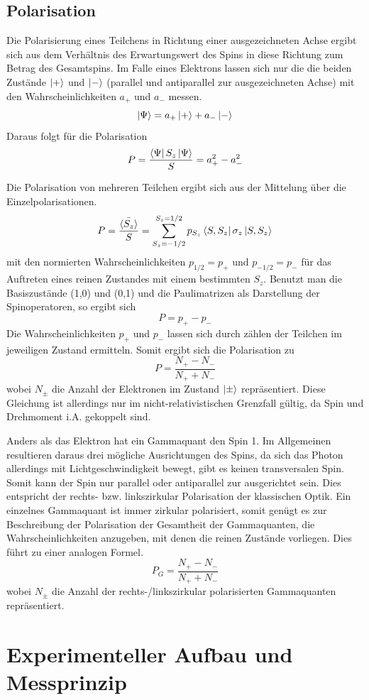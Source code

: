 \subsection{Polarisation}
Die Polarisierung eines Teilchens in Richtung einer ausgezeichneten Achse ergibt sich aus dem Verhältnis des Erwartungswert des Spins in diese Richtung zum Betrag des Gesamtspins. Im Falle eines Elektrons lassen sich nur die die beiden Zustände $\ket{+}$ und $\ket{-}$ (parallel und antiparallel zur ausgezeichneten Achse) mit den Wahrscheinlichkeiten $a_+$ und $a_-$ messen. 
$$\ket{\Psi} = a_+\ket{+} + a_-\ket{-}$$
Daraus folgt für die Polarisation
$$P = \frac{\bra{\Psi} S_z  \ket{\Psi}}{S} = a_+^2 - a_-^2$$

Die Polarisation von mehreren Teilchen ergibt sich aus der Mittelung über die Einzelpolarisationen. 
$$P = \Bar{\frac{{\braket{S_z}}}{S}} = \sum_{S_z = -1/2}^{S_z=1/2} p_{S_z} \bra{S,S_z}\sigma_z\ket{S,S_z}$$
mit den normierten Wahrscheinlichkeiten $p_{1/2} = p_+$ und $p_{-1/2}= p_-$ für das Auftreten eines reinen Zustandes mit einem bestimmten $S_z$. Benutzt man die Basiszustände (1,0) und (0,1) und die Paulimatrizen als Darstellung der Spinoperatoren, so ergibt sich 
$$P = p_+ - p_-$$
Die Wahrscheinlichkeiten $p_+$ und $p_-$ lassen sich durch zählen der Teilchen im jeweiligen Zustand ermitteln. Somit ergibt sich die Polarisation zu
$$P = \frac{N_+ - N_-}{N_+ + N_-}$$
wobei $N_\pm$ die Anzahl der Elektronen im Zustand $\ket{\pm}$ repräsentiert. Diese Gleichung ist allerdings nur im nicht-relativistischen Grenzfall gültig, da Spin und Drehmoment i.A. gekoppelt sind. 

Anders als das Elektron hat ein Gammaquant den Spin 1. Im Allgemeinen resultieren daraus drei mögliche Ausrichtungen des Spins, da sich das Photon allerdings mit Lichtgeschwindigkeit bewegt, gibt es keinen transversalen Spin. Somit kann der Spin nur parallel oder antiparallel zur ausgerichtet sein. Dies entspricht der rechts- bzw. linkszirkular Polarisation der klassischen Optik. Ein einzelnes Gammaquant ist immer zirkular polarisiert, somit genügt es zur Beschreibung der Polarisation der Gesamtheit der Gammaquanten, die Wahrscheinlichkeiten anzugeben, mit denen die reinen Zustände vorliegen. Dies führt zu einer analogen Formel.
$$P_G = \frac{N_+ - N_-}{N_+ + N_-}$$
wobei $N_\pm$ die Anzahl der rechts-/linkszirkular polarisierten Gammaquanten repräsentiert. 

\section{Experimenteller Aufbau und Messprinzip}
